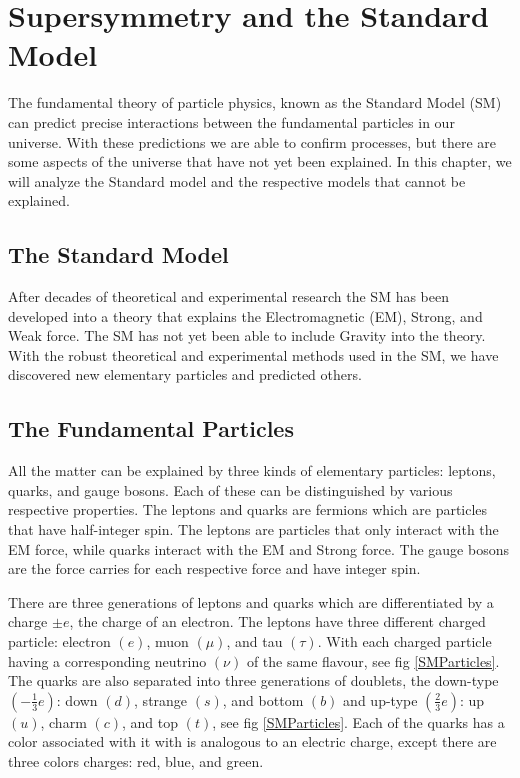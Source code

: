 \chapter{Supersymmetry and the Standard Model}
\label{ch:SUSY}

The fundamental theory of particle physics, known as the Standard Model (SM) can predict precise interactions between the fundamental particles in our universe. With these predictions we are able to confirm processes, but there are some aspects of the universe that have not yet been explained. In this chapter, we will analyze the Standard model and the respective models that cannot be explained.

\section{The Standard Model}
\label{sec:SM}

After decades of theoretical and experimental research the SM has been developed into a theory that explains the Electromagnetic (EM), Strong, and Weak force. The SM has not yet been able to include Gravity into the theory. With the robust theoretical and experimental methods used in the SM, we have discovered new elementary particles and predicted others. 

\section{The Fundamental Particles}

 All the matter can be explained by three kinds of elementary particles: leptons, quarks, and gauge bosons. Each of these can be distinguished by various respective properties. The leptons and quarks are fermions which are particles that have half-integer spin. The leptons are particles that only interact with the EM force, while quarks interact with the EM and Strong force. The gauge bosons are the force carries for each respective force and have integer spin. 
 
 There are three generations of leptons and quarks which are differentiated by a charge $\pm e$, the charge of an electron. The leptons have three different charged particle: electron $(e)$, muon $(\mu)$, and tau $(\tau)$. With each charged particle having a corresponding neutrino $(\nu)$ of the same flavour, see fig \ref{SMParticles}. The quarks are also separated into three generations of doublets, the down-type $(-\frac{1}{3}e)$: down $(d)$, strange $(s)$, and bottom $(b)$ and up-type $(\frac{2}{3}e)$: up $(u)$, charm $(c)$, and top $(t)$, see fig \ref{SMParticles}. Each of the quarks has a color associated with it with is analogous to an electric charge, except there are three colors charges: red, blue, and green.  


